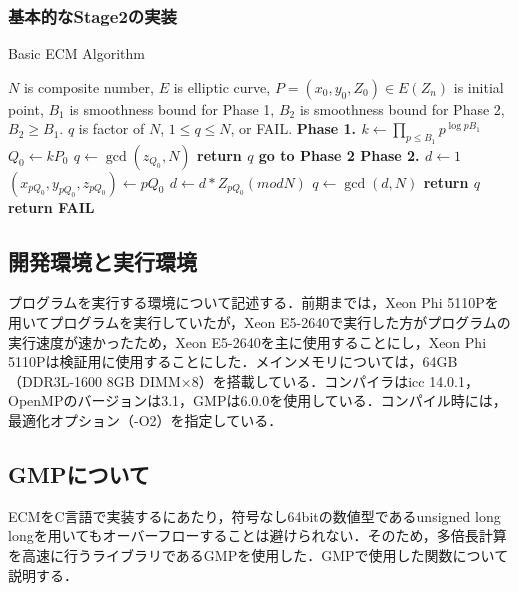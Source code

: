\documentclass[openany,11pt,papersize]{jsbook}
\begin{document}
\subsubsection*{基本的なStage2の実装}

\begin{algorithm}[H]                   
\caption{Basic ECM Algorithm}
\label{alg:B}                          
\begin{algorithmic}                  
\REQUIRE $N$ is composite number, $E$ is elliptic curve, $P = (x_0, y_0, Z_0) \in E(Z_n)$ is initial point, $B_1$ is smoothness bound for Phase 1, $B_2$ is smoothness bound for Phase 2, $B_2 \ge B_1.$
\ENSURE $q$ is factor of $N$, $1 \le q \leq N$, or FAIL.
\STATE \bfseries{Phase 1.}
\STATE $k \gets \prod_{p \leq B_1} p^{\log{p} B_1}$
\STATE $Q_0 \gets kP_0$
\STATE $q \gets \gcd(z_{Q_0},N)$
\STATE return $q$
\ELSE
\STATE go to Phase 2
\ENDIF
\STATE \bfseries{Phase 2.}
\STATE $d \gets 1$
\STATE $(x_{pQ_0},y_{pQ_0},z_{pQ_0}) \gets pQ_0$
\STATE $d \gets d*Z_{pQ_0} (mod N)$
\ENDFOR
\STATE $q \gets \gcd(d,N)$
\STATE return $q$
\ELSE
\STATE return FAIL
\ENDIF
\end{algorithmic}
\end{algorithm}


\subsection{開発環境と実行環境}
プログラムを実行する環境について記述する．前期までは，Xeon Phi 5110Pを用いてプログラムを実行していたが，Xeon E5-2640で実行した方がプログラムの実行速度が速かったため，Xeon E5-2640を主に使用することにし，Xeon Phi 5110Pは検証用に使用することにした．メインメモリについては，64GB（DDR3L-1600 8GB DIMM×8）を搭載している．コンパイラはicc 14.0.1，OpenMPのバージョンは3.1，GMPは6.0.0を使用している．コンパイル時には，最適化オプション（-O2）を指定している．

\subsection{GMPについて}
ECMをC言語で実装するにあたり，符号なし64bitの数値型であるunsigned long longを用いてもオーバーフローすることは避けられない．そのため，多倍長計算を高速に行うライブラリであるGMPを使用した．GMPで使用した関数について説明する．
\end{document}
